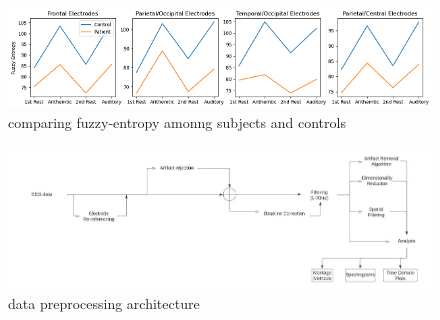 \documentclass[10pt]{article}
\begin{document}
\begin{figure}[H]
  \includegraphics{images/categoriesEntropies.png}
  \caption{comparing fuzzy-entropy amonng subjects and controls}
  \label{fig:subject entropy comparison}
\end{figure}

\begin{figure}[H]
  \includegraphics{images/preProcessing.jpeg}
  \caption{data preprocessing architecture}
  \label{fig:data preprocessing}
\end{figure}
\end{document}
